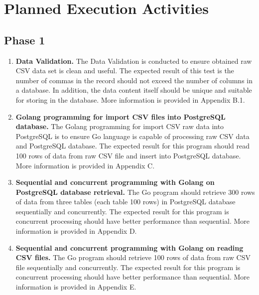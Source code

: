 \section{Planned Execution Activities}

\subsection{Phase 1}

\begin{enumerate}[topsep=0pt,itemsep=-1ex,partopsep=1ex,parsep=1.5ex]
	
	\item \textbf{Data Validation.}
	 The Data Validation is conducted to ensure obtained raw CSV data set is clean and useful. The expected result of this test is the number of commas in the record should not exceed the number of columns in a database. In addition, the data content itself should be unique and suitable for storing in the database. More information is provided in Appendix B.1.
		
	\item \textbf{Golang programming for import CSV files into PostgreSQL database.}
	The Golang programming for import CSV raw data into PostgreSQL is to ensure Go language is capable of processing raw CSV data and PostgreSQL database. The expected result for this program should read 100 rows of data from raw CSV file and insert into PostgreSQL database. More information is provided in Appendix C.
	\pagebreak
	
	\item \textbf{Sequential and concurrent programming with Golang on PostgreSQL database retrieval.}
    The Go program should retrieve 300 rows of data from three tables (each table 100 rows) in PostgreSQL database sequentially and concurrently. The expected result for this program is concurrent processing should have better performance than sequential. More information is provided in Appendix D.	
	
	\item \textbf{Sequential and concurrent programming with Golang on reading CSV files.}
	The Go program should retrieve 100 rows of data from raw CSV file sequentially and concurrently. The expected result for this program is concurrent processing should have better performance than sequential. More information is provided in Appendix E.
	 
\end{enumerate}

